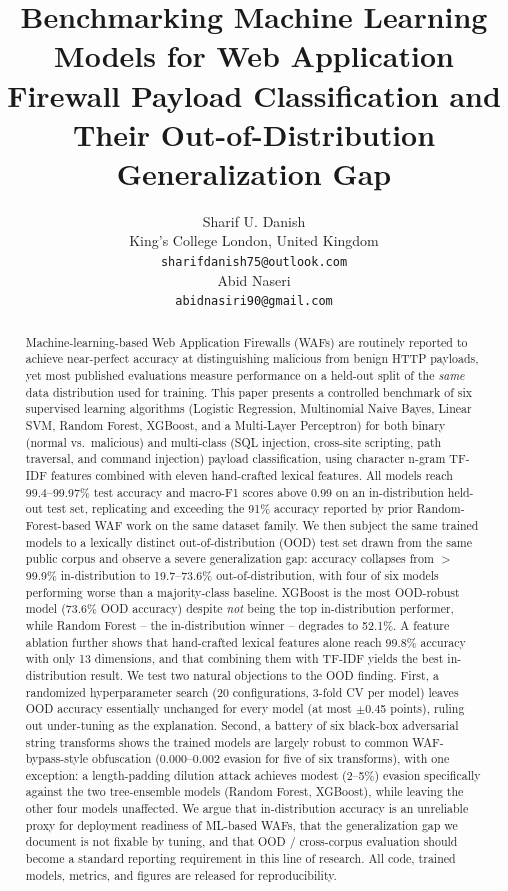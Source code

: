 \documentclass{article}
\title{Benchmarking Machine Learning Models for Web Application Firewall Payload Classification and Their Out-of-Distribution Generalization Gap}
\author{
  Sharif U. Danish \\
  King's College London, United Kingdom \\
  \texttt{sharifdanish75@outlook.com} \\
  \And
  Abid Naseri \\
  \texttt{abidnasiri90@gmail.com}
}
\begin{document}
\maketitle

\begin{abstract}
Machine-learning-based Web Application Firewalls (WAFs) are routinely reported
to achieve near-perfect accuracy at distinguishing malicious from benign HTTP
payloads, yet most published evaluations measure performance on a held-out
split of the \emph{same} data distribution used for training. This paper
presents a controlled benchmark of six supervised learning algorithms
(Logistic Regression, Multinomial Naive Bayes, Linear SVM, Random Forest,
XGBoost, and a Multi-Layer Perceptron) for both binary (normal vs.\ malicious)
and multi-class (SQL injection, cross-site scripting, path traversal, and
command injection) payload classification, using character n-gram TF-IDF
features combined with eleven hand-crafted lexical features. All models reach
99.4--99.97\% test accuracy and macro-F1 scores above 0.99 on an
in-distribution held-out test set, replicating and exceeding the 91\% accuracy
reported by prior Random-Forest-based WAF work on the same dataset family. We
then subject the same trained models to a lexically distinct out-of-distribution
(OOD) test set drawn from the same public corpus and observe a severe
generalization gap: accuracy collapses from $>$99.9\% in-distribution to
19.7--73.6\% out-of-distribution, with four of six models performing worse
than a majority-class baseline. XGBoost is the most OOD-robust model
(73.6\% OOD accuracy) despite \emph{not} being the top in-distribution
performer, while Random Forest -- the in-distribution winner -- degrades to
52.1\%. A feature ablation further shows that hand-crafted lexical features
alone reach 99.8\% accuracy with only 13 dimensions, and that combining them
with TF-IDF yields the best in-distribution result. We test two natural
objections to the OOD finding. First, a randomized hyperparameter search
(20 configurations, 3-fold CV per model) leaves OOD accuracy essentially
unchanged for every model (at most $\pm$0.45 points), ruling out
under-tuning as the explanation. Second, a battery of six black-box
adversarial string transforms shows the trained models are largely robust
to common WAF-bypass-style obfuscation (0.000--0.002 evasion for five of
six transforms), with one exception: a length-padding dilution attack
achieves modest (2--5\%) evasion specifically against the two
tree-ensemble models (Random Forest, XGBoost), while leaving the other four
models unaffected. We argue that in-distribution accuracy is an unreliable
proxy for deployment readiness of ML-based WAFs, that the generalization
gap we document is not fixable by tuning, and that OOD / cross-corpus
evaluation should become a standard reporting requirement in this line of
research. All code, trained models, metrics, and figures are released for
reproducibility.
\end{abstract}
\end{document}
